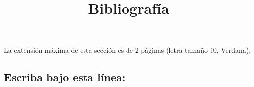 \documentclass[10pt,prl]{revtex4}
\begin{document}
\title{ Bibliograf\'ia}
\maketitle

La extensi\'on m\'axima de esta secci\'on es de 2 p\'aginas (letra tama\~no 10, Verdana).


\maketitle
\subsection{Escriba bajo esta l\'inea:}
\end{document}
